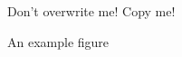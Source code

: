 \begin{figure}[htbp]
    \small
\begin{mdframed}
    Don't overwrite me! Copy me!
\end{mdframed}
    \label{fig:}
    \caption{An example figure}
\end{figure}